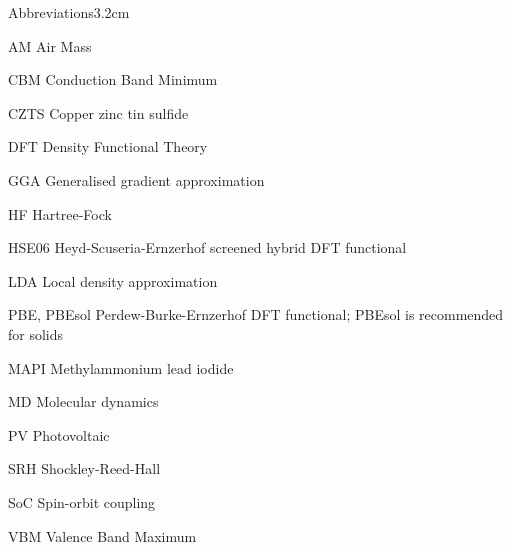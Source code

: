 \begin{mclistof}{Abbreviations}{3.2cm}

\item[AM] Air Mass
\item[CBM] Conduction Band Minimum
\item[CZTS] Copper zinc tin sulfide
\item[DFT] Density Functional Theory
\item[GGA] Generalised gradient approximation
\item[HF] Hartree-Fock
\item[HSE06] Heyd-Scuseria-Ernzerhof screened hybrid DFT functional 
\item[LDA] Local density approximation
\item[PBE, PBEsol] Perdew-Burke-Ernzerhof DFT functional; PBEsol is recommended for solids
\item[MAPI] Methylammonium lead iodide
\item[MD] Molecular dynamics
\item[PV] Photovoltaic
\item[SRH] Shockley-Reed-Hall 
\item[SoC] Spin-orbit coupling
\item[VBM] Valence Band Maximum

\end{mclistof} 
